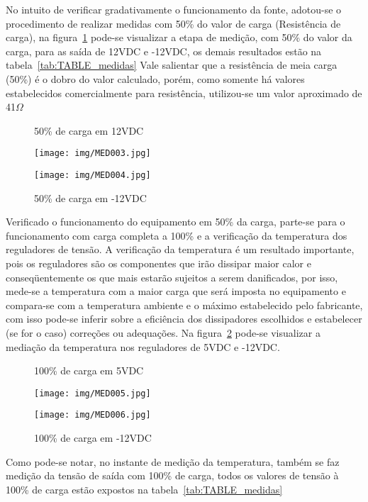 \documentclass[
	article,			%
	11pt,				%
	oneside,			%
	a4paper,			%
	english,			%
	brazil,				%
	sumario=tradicional
	]{abntex2}
\begin{document}
No intuito de verificar gradativamente o funcionamento da fonte, adotou-se o procedimento de realizar medidas com 50\% do valor de carga (Resistência de carga), na figura~\ref{fig:FIG_MED50} pode-se visualizar a etapa de medição, com 50\% do valor da carga, para as saída de 12VDC e -12VDC, os demais resultados estão na tabela~\ref{tab:TABLE_medidas} Vale salientar que a resistência de meia carga (50\%) é o dobro do valor calculado, porém, como somente há valores estabelecidos comercialmente para resistência, utilizou-se um valor aproximado de 41$\Omega$
\begin{figure}[htb!]
   \centering
   \begin{minipage}{0.4\textwidth}
   		\centering
   		\caption{50\% de carga em 12VDC} \label{MED003}
   		\texttt{[image: img/MED003.jpg]}
   \end{minipage}
   \hspace{1.5cm}
   \begin{minipage}{0.4\textwidth}
   		\centering
   		\caption{50\% de carga em -12VDC} \label{MED004}
   		\texttt{[image: img/MED004.jpg]} 
   \end{minipage}
   \label{fig:FIG_MED50}
\end{figure}

Verificado o funcionamento do equipamento em 50\% da carga, parte-se para o funcionamento com carga completa a 100\% e a verificação da temperatura dos reguladores de tensão. A verificação da temperatura é um resultado importante, pois os reguladores são os componentes que irão dissipar maior calor e conseqüentemente os que mais estarão sujeitos a serem danificados, por isso, mede-se a temperatura com a maior carga que será imposta no equipamento e compara-se com a temperatura ambiente e o máximo estabelecido pelo fabricante, com isso pode-se inferir sobre a eficiência dos dissipadores escolhidos e estabelecer (se for o caso) correções ou adequações. Na figura~\ref{fig:FIG_MED100} pode-se visualizar a mediação da temperatura nos reguladores de 5VDC e -12VDC.
\begin{figure}[htb!]
   \centering
   \begin{minipage}{0.4\textwidth}
   		\centering
   		\caption{100\% de carga em 5VDC} \label{MED005}
   		\texttt{[image: img/MED005.jpg]}
   \end{minipage}
   \hspace{1.5cm}
   \begin{minipage}{0.4\textwidth}
   		\centering
   		\caption{100\% de carga em -12VDC} \label{MED006}
   		\texttt{[image: img/MED006.jpg]} 
   \end{minipage}
   \label{fig:FIG_MED100}
\end{figure}
Como pode-se notar, no instante de medição da temperatura, também se faz medição da tensão de saída com 100\% de carga, todos os valores de tensão à 100\% de carga estão expostos na tabela~\ref{tab:TABLE_medidas}
\end{document}
